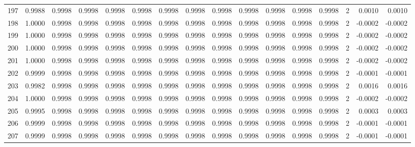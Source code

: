 \begin{tabular}{lrrrrrrrrrrrrrrr}
197 &      0.9988 &  0.9998 &  0.9998 &  0.9998 &  0.9998 &  0.9998 &  0.9998 &  0.9998 &  0.9998 &  0.9998 &   0.9998 &     0.9998 &      2 &                    0.0010 &                     0.0010 \\
198 &      1.0000 &  0.9998 &  0.9998 &  0.9998 &  0.9998 &  0.9998 &  0.9998 &  0.9998 &  0.9998 &  0.9998 &   0.9998 &     0.9998 &      2 &                   -0.0002 &                    -0.0002 \\
199 &      1.0000 &  0.9998 &  0.9998 &  0.9998 &  0.9998 &  0.9998 &  0.9998 &  0.9998 &  0.9998 &  0.9998 &   0.9998 &     0.9998 &      2 &                   -0.0002 &                    -0.0002 \\
200 &      1.0000 &  0.9998 &  0.9998 &  0.9998 &  0.9998 &  0.9998 &  0.9998 &  0.9998 &  0.9998 &  0.9998 &   0.9998 &     0.9998 &      2 &                   -0.0002 &                    -0.0002 \\
201 &      1.0000 &  0.9998 &  0.9998 &  0.9998 &  0.9998 &  0.9998 &  0.9998 &  0.9998 &  0.9998 &  0.9998 &   0.9998 &     0.9998 &      2 &                   -0.0002 &                    -0.0002 \\
202 &      0.9999 &  0.9998 &  0.9998 &  0.9998 &  0.9998 &  0.9998 &  0.9998 &  0.9998 &  0.9998 &  0.9998 &   0.9998 &     0.9998 &      2 &                   -0.0001 &                    -0.0001 \\
203 &      0.9982 &  0.9998 &  0.9998 &  0.9998 &  0.9998 &  0.9998 &  0.9998 &  0.9998 &  0.9998 &  0.9998 &   0.9998 &     0.9998 &      2 &                    0.0016 &                     0.0016 \\
204 &      1.0000 &  0.9998 &  0.9998 &  0.9998 &  0.9998 &  0.9998 &  0.9998 &  0.9998 &  0.9998 &  0.9998 &   0.9998 &     0.9998 &      2 &                   -0.0002 &                    -0.0002 \\
205 &      0.9995 &  0.9998 &  0.9998 &  0.9998 &  0.9998 &  0.9998 &  0.9998 &  0.9998 &  0.9998 &  0.9998 &   0.9998 &     0.9998 &      2 &                    0.0003 &                     0.0003 \\
206 &      0.9999 &  0.9998 &  0.9998 &  0.9998 &  0.9998 &  0.9998 &  0.9998 &  0.9998 &  0.9998 &  0.9998 &   0.9998 &     0.9998 &      2 &                   -0.0001 &                    -0.0001 \\
207 &      0.9999 &  0.9998 &  0.9998 &  0.9998 &  0.9998 &  0.9998 &  0.9998 &  0.9998 &  0.9998 &  0.9998 &   0.9998 &     0.9998 &      2 &                   -0.0001 &                    -0.0001 \\

\end{tabular}

